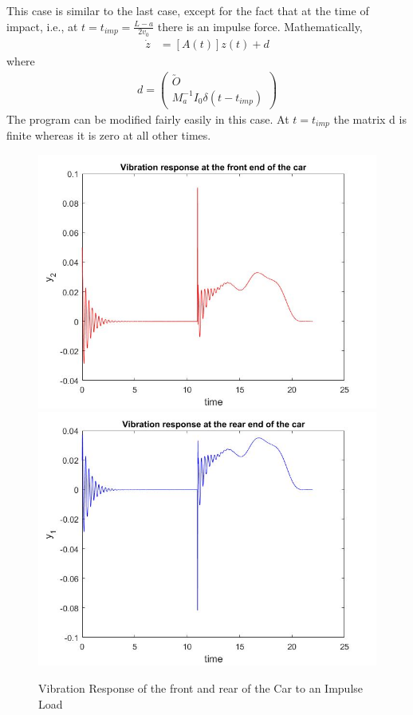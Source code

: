 \documentclass[11pt, oneside]{article}   	%
\begin{document}
This case is similar to the last case, except for the fact that at the time of impact, i.e., at $t=t_{imp} = \frac{L-a}{2v_0}$ there is an impulse force. Mathematically, 
\begin{align}
\dot{z} &= [A(t)] z(t) + d
\end{align}
where
\begin{align}
d = \begin{pmatrix}
\utilde{O}\\
M_a^{-1} I_0 \delta(t-t_{imp})
\end{pmatrix}
\end{align}
The program can be modified fairly easily in this case. At $t=t_{imp}$ the matrix d is finite whereas it is zero at all other times. 
\begin{figure}[!htbp]
	\centering
	\includegraphics[scale=0.3]{CarVibFront_Impulse}
	\includegraphics[scale=0.3]{CarVibRear_Impulse}
	\caption{Vibration Response of the front and rear of the Car to an Impulse Load}
\end{figure}
\end{document}
